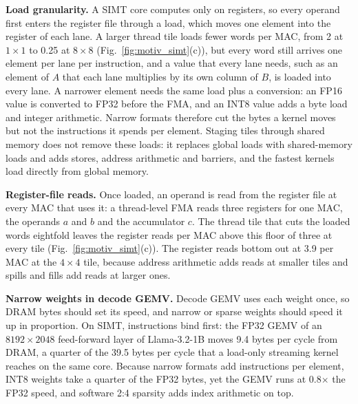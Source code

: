 \textbf{Load granularity.} A SIMT core computes only on registers, so every operand first enters the register file through a load, which moves one element into the register of each lane. A larger thread tile loads fewer words per MAC, from 2 at $1{\times}1$ to 0.25 at $8{\times}8$ (Fig.~\ref{fig:motiv_simt}(c)), but every word still arrives one element per lane per instruction, and a value that every lane needs, such as an element of $A$ that each lane multiplies by its own column of $B$, is loaded into every lane. A narrower element needs the same load plus a conversion: an FP16 value is converted to FP32 before the FMA, and an INT8 value adds a byte load and integer arithmetic. Narrow formats therefore cut the bytes a kernel moves but not the instructions it spends per element. Staging tiles through shared memory does not remove these loads: it replaces global loads with shared-memory loads and adds stores, address arithmetic and barriers, and the fastest kernels load directly from global memory.

\textbf{Register-file reads.} Once loaded, an operand is read from the register file at every MAC that uses it: a thread-level FMA reads three registers for one MAC, the operands $a$ and $b$ and the accumulator $c$. The thread tile that cuts the loaded words eightfold leaves the register reads per MAC above this floor of three at every tile (Fig.~\ref{fig:motiv_simt}(c)). The register reads bottom out at 3.9 per MAC at the $4{\times}4$ tile, because address arithmetic adds reads at smaller tiles and spills and fills add reads at larger ones.

\textbf{Narrow weights in decode GEMV.} Decode GEMV uses each weight once, so DRAM bytes should set its speed, and narrow or sparse weights should speed it up in proportion. On SIMT, instructions bind first: the FP32 GEMV of an $8192{\times}2048$ feed-forward layer of Llama-3.2-1B moves 9.4 bytes per cycle from DRAM, a quarter of the 39.5 bytes per cycle that a load-only streaming kernel reaches on the same core. Because narrow formats add instructions per element, INT8 weights take a quarter of the FP32 bytes, yet the GEMV runs at 0.8$\times$ the FP32 speed, and software 2:4 sparsity adds index arithmetic on top.

